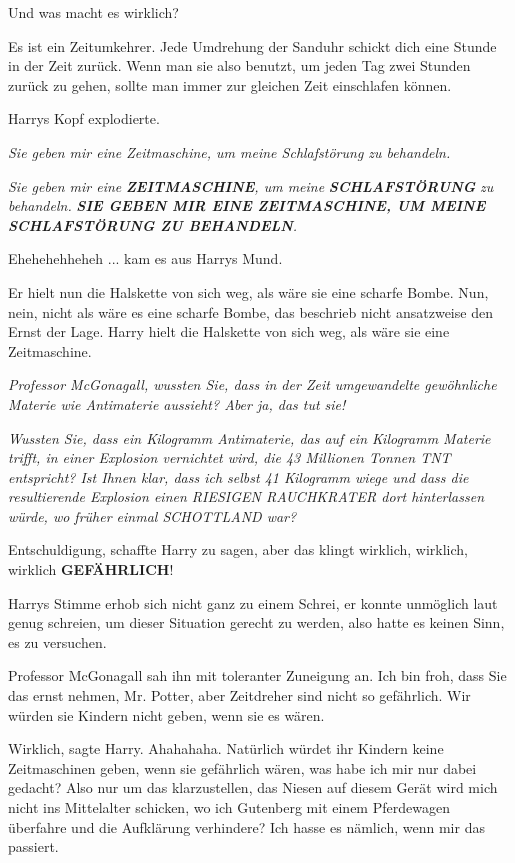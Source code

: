 \glqq{}Und was macht es wirklich?\grqq{}

\glqq{}Es ist ein Zeitumkehrer. Jede Umdrehung der Sanduhr schickt dich eine
Stunde in der Zeit zurück. Wenn man sie also benutzt, um jeden Tag zwei Stunden
zurück zu gehen, sollte man immer zur gleichen Zeit einschlafen können.\grqq{}

Harrys Kopf explodierte.

\emph{Sie geben mir eine Zeitmaschine, um meine Schlafstörung zu behandeln.}

\emph{Sie geben mir eine} \textbf{\emph{ZEITMASCHINE}}\emph{, um meine
}\textbf{\emph{SCHLAFSTÖRUNG}} \emph{zu behandeln.} \emph{}\textbf{\emph{SIE
GEBEN MIR EINE ZEITMASCHINE, UM MEINE SCHLAFSTÖRUNG ZU BEHANDELN}}\emph{.}

\glqq{}Ehehehehheheh ...\grqq{} kam es aus Harrys Mund.

Er hielt nun die Halskette von sich weg, als wäre sie eine scharfe Bombe. Nun,
nein, nicht als wäre es eine scharfe Bombe, das beschrieb nicht ansatzweise den
Ernst der Lage. Harry hielt die Halskette von sich weg, als wäre sie eine
Zeitmaschine.

\emph{Professor McGonagall, wussten Sie, dass in der Zeit umgewandelte
gewöhnliche Materie wie Antimaterie aussieht? Aber ja, das tut sie!}

\emph{Wussten Sie, dass ein Kilogramm Antimaterie, das auf ein Kilogramm Materie
trifft, in einer Explosion vernichtet wird, die 43 Millionen Tonnen TNT
entspricht? Ist Ihnen klar, dass ich selbst 41 Kilogramm wiege und dass die
resultierende Explosion einen RIESIGEN RAUCHKRATER dort hinterlassen würde, wo
früher einmal SCHOTTLAND war?}

\glqq{}Entschuldigung\grqq{}, schaffte Harry zu sagen, \glqq{}aber das klingt
wirklich, wirklich, wirklich \textbf{GEFÄHRLICH}!\grqq{}

Harrys Stimme erhob sich nicht ganz zu einem Schrei, er konnte unmöglich laut
genug schreien, um dieser Situation gerecht zu werden, also hatte es keinen
Sinn, es zu versuchen.

Professor McGonagall sah ihn mit toleranter Zuneigung an. \glqq{}Ich bin froh,
dass Sie das ernst nehmen, Mr. Potter, aber Zeitdreher sind nicht so gefährlich.
Wir würden sie Kindern nicht geben, wenn sie es wären.\grqq{}

\glqq{}Wirklich\grqq{}, sagte Harry. \glqq{}Ahahahaha. Natürlich würdet ihr
Kindern keine Zeitmaschinen geben, wenn sie gefährlich wären, was habe ich mir
nur dabei gedacht? Also nur um das klarzustellen, das Niesen auf diesem Gerät
wird mich nicht ins Mittelalter schicken, wo ich Gutenberg mit einem Pferdewagen
überfahre und die Aufklärung verhindere? Ich hasse es nämlich, wenn mir das
passiert.\grqq{}

